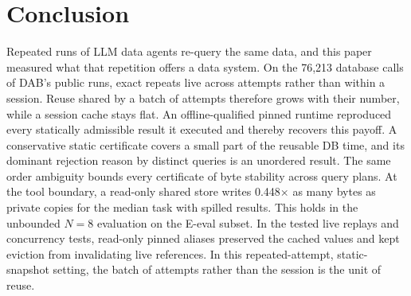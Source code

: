 \section{Conclusion}
\label{sec:conclusion}

Repeated runs of LLM data agents re-query the same data, and this paper measured what that repetition offers a data
system. On the 76,213 database calls of DAB's public runs, exact repeats live across attempts rather than within a
session. Reuse shared by a batch of attempts therefore grows with their number, while a session cache stays flat.
An offline-qualified pinned runtime reproduced every statically admissible result it executed and thereby recovers
this payoff. A conservative static certificate covers a small part of the reusable DB time, and its dominant
rejection reason by distinct queries is an unordered result. The same order ambiguity bounds every certificate of
byte stability across query plans. At the tool boundary, a read-only shared store writes 0.448$\times$ as many
bytes as private copies for the median task with spilled results. This holds in the unbounded $N=8$ evaluation on
the E-eval subset. In the tested live replays and concurrency tests, read-only pinned aliases preserved the cached
values and kept eviction from invalidating live references. In this repeated-attempt, static-snapshot setting, the
batch of attempts rather than the session is the unit of reuse.
